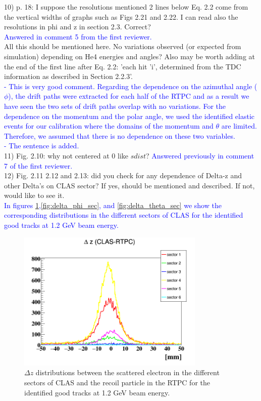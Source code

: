 10) p. 18: I suppose the resolutions mentioned 2 lines below Eq. 2.2 come from the 
vertical widths of graphs such as Figs 2.21 and 2.22. I can read also the 
resolutions in phi and z in section 2.3. Correct?\\
 \textcolor{blue}{ Answered in comment 5 from the first reviewer.  }\\

All this should be mentioned here.  No variations observed (or expected from 
simulation) depending on He4 energies and angles? Also may be worth adding at 
the end of the first line after Eq. 2.2: 'each hit 'i', determined from the TDC 
information as described in Section 2.2.3'.\\
  \textcolor{blue}{
     - This is very good comment. Regarding the dependence on the azimuthal 
     angle ($\phi$), the drift paths were extracted for each half of the RTPC 
     and as a result we have seen the two sets of drift paths overlap with no 
     variations. For the dependence on the momentum and the polar angle, we 
     used the identified elastic events for our calibration where the domains 
     of the momentum and $\theta$ are limited. Therefore, we assumed that there 
     is no dependence on these two variables. \\
  - The sentence is added.}\\
 

11) Fig. 2.10: why not centered at 0 like $sdist$?
\textcolor{blue}{ Answered previously in comment 7 of the first reviewer.}\\


12) Fig. 2.11 2.12 and 2.13: did you check for any dependence of Delta-z and other 
Delta's on CLAS sector? If yes, should be mentioned and described. If not, 
would like to see it.\\
\textcolor{blue}{In figures \ref{fig:delta_z_sec},\ref{fig:delta_phi_sec}, and 
\ref{fig:delta_theta_sec} we show the corresponding distributions in the 
different sectors of CLAS for the identified good tracks at 1.2 GeV beam 
energy.}\\

\begin{figure}[h!]
\centering
\includegraphics[height=6.7cm]{fig/delta_z_sec.png}
\caption{$\Delta z$ distributions between the scattered electron in the 
different sectors of CLAS and the recoil particle in the RTPC for the 
identified good tracks at 1.2 GeV beam energy.}
\label{fig:delta_z_sec}
 \end{figure}


